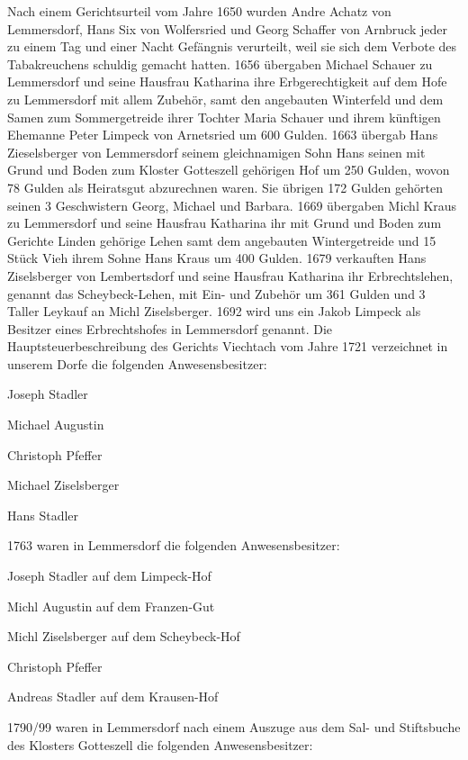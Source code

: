 Nach einem Gerichtsurteil vom Jahre 1650 wurden Andre Achatz von Lemmersdorf,
Hans Six von Wolfersried und Georg Schaffer von Arnbruck jeder zu einem Tag und
einer Nacht Gefängnis verurteilt, weil sie sich dem Verbote des Tabakreuchens
schuldig gemacht hatten. 1656 übergaben Michael Schauer zu Lemmersdorf und seine
Hausfrau Katharina ihre Erbgerechtigkeit auf dem Hofe zu Lemmersdorf mit allem
Zubehör, samt den angebauten Winterfeld und dem Samen zum Sommergetreide ihrer
Tochter Maria Schauer und ihrem künftigen Ehemanne Peter Limpeck von Arnetsried
um 600 Gulden. 1663 übergab Hans Zieselsberger von Lemmersdorf seinem
gleichnamigen Sohn Hans seinen mit Grund und Boden zum Kloster Gotteszell
gehörigen Hof um 250 Gulden, wovon 78 Gulden als Heiratsgut abzurechnen waren.
Sie übrigen 172 Gulden gehörten seinen 3 Geschwistern Georg, Michael und
Barbara. 1669 übergaben Michl Kraus zu Lemmersdorf und seine Hausfrau Katharina
ihr mit Grund und Boden zum Gerichte Linden gehörige Lehen samt dem angebauten
Wintergetreide und 15 Stück Vieh ihrem Sohne Hans Kraus um 400 Gulden. 1679
verkauften Hans Ziselsberger von Lembertsdorf und seine Hausfrau Katharina ihr
Erbrechtslehen, genannt das Scheybeck-Lehen, mit Ein- und Zubehör um 361 Gulden
und 3 Taller Leykauf an Michl Ziselsberger. 1692 wird uns ein Jakob Limpeck als
Besitzer eines Erbrechtshofes in Lemmersdorf genannt. Die
Hauptsteuerbeschreibung des Gerichts Viechtach vom Jahre 1721 verzeichnet in
unserem Dorfe die folgenden Anwesensbesitzer:



Joseph Stadler

Michael Augustin

Christoph Pfeffer

Michael Ziselsberger

Hans Stadler



1763 waren in Lemmersdorf die folgenden Anwesensbesitzer:



Joseph Stadler auf dem Limpeck-Hof

Michl Augustin auf dem Franzen-Gut

Michl Ziselsberger auf dem Scheybeck-Hof

Christoph Pfeffer

Andreas Stadler auf dem Krausen-Hof



1790/99 waren in Lemmersdorf nach einem Auszuge aus dem Sal- und Stiftsbuche des
Klosters Gotteszell die folgenden Anwesensbesitzer:



